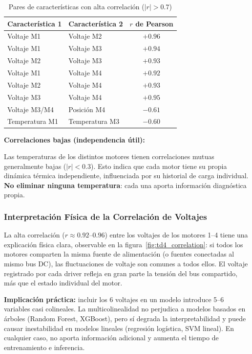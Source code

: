 \documentclass[12pt,a4paper]{article}
\begin{document}
\begin{table}[H]
\centering
\caption{Pares de características con alta correlación ($|r| > 0.7$)}
\begin{tabular}{@{}llc@{}}
\toprule
\textbf{Característica 1} & \textbf{Característica 2} & \textbf{$r$ de Pearson}\\
\midrule
Voltaje M1 & Voltaje M2 & $+0.96$\\
Voltaje M1 & Voltaje M3 & $+0.94$\\
Voltaje M2 & Voltaje M3 & $+0.93$\\
Voltaje M1 & Voltaje M4 & $+0.92$\\
Voltaje M2 & Voltaje M4 & $+0.93$\\
Voltaje M3 & Voltaje M4 & $+0.95$\\
\midrule
Voltaje M3/M4 & Posición M4 & $-0.61$\\
Temperatura M1 & Temperatura M3 & $-0.60$\\
\bottomrule
\end{tabular}
\end{table}

\textbf{Correlaciones bajas (independencia útil):}

Las temperaturas de los distintos motores tienen correlaciones mutuas generalmente
bajas ($|r| < 0.3$). Esto indica que cada motor tiene su propia dinámica térmica
independiente, influenciada por su historial de carga individual. \textbf{No eliminar
ninguna temperatura}: cada una aporta información diagnóstica propia.

\subsubsection{Interpretación Física de la Correlación de Voltajes}

La alta correlación ($r \approx 0.92$--$0.96$) entre los voltajes de los motores 1--4
tiene una explicación física clara, observable en la figura~\ref{fig:td4_correlation}:
si todos los motores comparten la misma fuente de alimentación (o fuentes conectadas
al mismo bus DC), las fluctuaciones de voltaje son comunes a todos ellos. El voltaje
registrado por cada driver refleja en gran parte la tensión del bus compartido, más
que el estado individual del motor.

\textbf{Implicación práctica:} incluir los 6 voltajes en un modelo introduce
5--6 variables casi colineales. La multicolinealidad no perjudica a modelos basados
en árboles (Random Forest, XGBoost), pero sí degrada la interpretabilidad y puede
causar inestabilidad en modelos lineales (regresión logística, SVM lineal). En cualquier
caso, no aporta información adicional y aumenta el tiempo de entrenamiento e inferencia.
\end{document}
